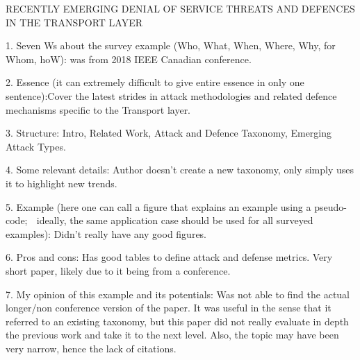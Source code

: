 RECENTLY EMERGING DENIAL OF SERVICE THREATS AND DEFENCES IN THE TRANSPORT LAYER

1. Seven Ws about the survey example (Who, What, When, Where, Why, for Whom, hoW): was from 2018 IEEE Canadian conference.

2. Essence (it can extremely difficult to give entire essence in only one sentence):Cover the latest strides in attack methodologies and related defence mechanisms specific to the Transport layer.

3. Structure: Intro, Related Work, Attack and Defence Taxonomy, Emerging Attack Types.

4. Some relevant details: Author doesn't create a new taxonomy, only simply uses it to highlight new trends.

5. Example (here one can call a figure that explains an example using a pseudo-code;  ideally, the same application case should be used for all surveyed examples): Didn't really have any good figures.

6. Pros and cons: Has good tables to define attack and defense metrics. Very short paper, likely due to it being from a conference.

7. My opinion of this example and its potentials:
Was not able to find the actual longer/non conference version of the paper. It was useful in the sense that it referred to an existing taxonomy, but this paper did not really evaluate in depth the previous work and take it to the next level. Also, the topic may have been very narrow, hence the lack of citations.